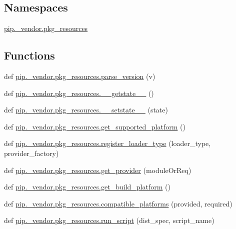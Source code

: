 \subsection*{Namespaces}
\begin{DoxyCompactItemize}
\item 
 \hyperlink{namespacepip_1_1__vendor_1_1pkg__resources}{pip.\+\_\+vendor.\+pkg\+\_\+resources}
\end{DoxyCompactItemize}
\subsection*{Functions}
\begin{DoxyCompactItemize}
\item 
def \hyperlink{namespacepip_1_1__vendor_1_1pkg__resources_a92bc2b76ba59a7f7e2c264890b280a65}{pip.\+\_\+vendor.\+pkg\+\_\+resources.\+parse\+\_\+version} (v)
\item 
def \hyperlink{namespacepip_1_1__vendor_1_1pkg__resources_a4c70a72dcaf99f401d138ec049176056}{pip.\+\_\+vendor.\+pkg\+\_\+resources.\+\_\+\+\_\+getstate\+\_\+\+\_\+} ()
\item 
def \hyperlink{namespacepip_1_1__vendor_1_1pkg__resources_a9c7db7bd62f73502d9bcae10ee143b3f}{pip.\+\_\+vendor.\+pkg\+\_\+resources.\+\_\+\+\_\+setstate\+\_\+\+\_\+} (state)
\item 
def \hyperlink{namespacepip_1_1__vendor_1_1pkg__resources_a2727b5097b331e5359881914dc788fb7}{pip.\+\_\+vendor.\+pkg\+\_\+resources.\+get\+\_\+supported\+\_\+platform} ()
\item 
def \hyperlink{namespacepip_1_1__vendor_1_1pkg__resources_ac15df9eeda704ffb4382ff13f2dfdc1a}{pip.\+\_\+vendor.\+pkg\+\_\+resources.\+register\+\_\+loader\+\_\+type} (loader\+\_\+type, provider\+\_\+factory)
\item 
def \hyperlink{namespacepip_1_1__vendor_1_1pkg__resources_a677e93db6d072e044e0e907c17804b01}{pip.\+\_\+vendor.\+pkg\+\_\+resources.\+get\+\_\+provider} (module\+Or\+Req)
\item 
def \hyperlink{namespacepip_1_1__vendor_1_1pkg__resources_ae7c894b8998697abd9ca6a173f5cbf83}{pip.\+\_\+vendor.\+pkg\+\_\+resources.\+get\+\_\+build\+\_\+platform} ()
\item 
def \hyperlink{namespacepip_1_1__vendor_1_1pkg__resources_a472d6f1734f7c0deaf68c27b07f97704}{pip.\+\_\+vendor.\+pkg\+\_\+resources.\+compatible\+\_\+platforms} (provided, required)
\item 
def \hyperlink{namespacepip_1_1__vendor_1_1pkg__resources_a96e7a55f46096d50d6783754f8922f2a}{pip.\+\_\+vendor.\+pkg\+\_\+resources.\+run\+\_\+script} (dist\+\_\+spec, script\+\_\+name)

\end{DoxyCompactItemize}
